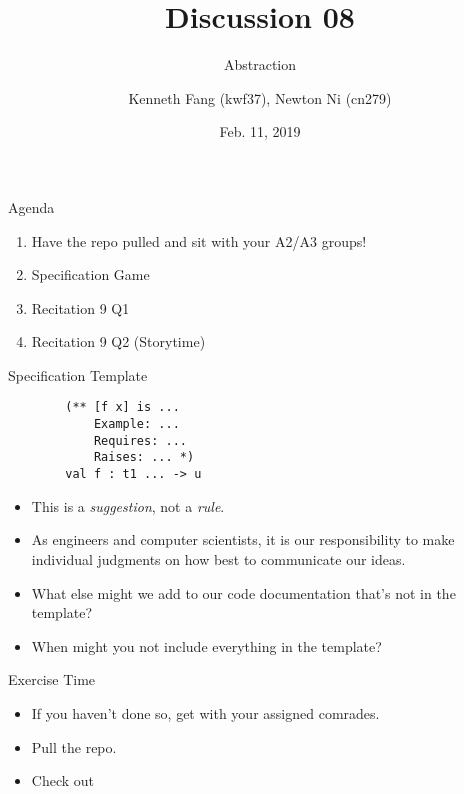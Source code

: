 \documentclass{beamer}
\title{Discussion 08}
\subtitle{Abstraction}
\author{Kenneth Fang (kwf37), Newton Ni (cn279)}
\date{Feb. 11, 2019}
\begin{document}
    \begin{frame}
        \titlepage{}
    \end{frame}
    
    \begin{frame}{Agenda}
    \begin{enumerate}
        \item Have the repo pulled and sit with your A2/A3 groups!
    
        \item Specification Game 
        
        \item Recitation 9 Q1
        
        \item Recitation 9 Q2 (Storytime)
    \end{enumerate}
    \end{frame}
    
    
    \begin{frame}[fragile]{Specification Template}
        \begin{verbatim}
        (** [f x] is ...
            Example: ...
            Requires: ...
            Raises: ... *)
        val f : t1 ... -> u
        \end{verbatim}
    \begin{itemize}\pause
        \item This is a \textit{suggestion}, not a \textit{rule}. \pause
        \item As engineers and computer scientists, it is our responsibility to make individual judgments on how best to communicate our ideas. \pause
        \item What else might we add to our code documentation that's not in the template? \pause
        \item When might you not include everything in the template?
    \end{itemize}
    \end{frame}
    
    \begin{frame}{Exercise Time}
    \begin{itemize}
        \item If you haven't done so, get with your assigned comrades.
        \item Pull the repo.
        \item Check out 
    \end{itemize}
        
    \end{frame}
   
    
\end{document}
